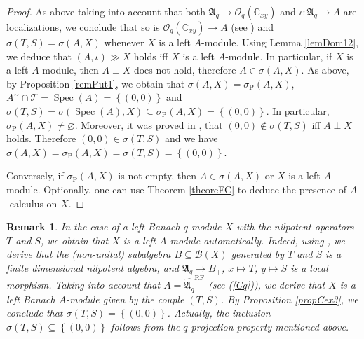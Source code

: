 \documentclass[12pt]{amsart}%
\theoremstyle{plain}
\newtheorem{remark}{Remark}
\numberwithin{equation}{section}
\numberwithin{equation}{section}
\numberwithin{theorem}{section}
\numberwithin{lemma}{section}
\numberwithin{remark}{section}
\numberwithin{example}{section}
\numberwithin{proposition}{section}
\numberwithin{definition}{section}
\numberwithin{corollary}{section}
\begin{document}
\begin{proof}
As above taking into account that both $\mathfrak{A}_{q}\rightarrow
\mathcal{O}_{q}\left(  \mathbb{C}_{xy}\right)  $ and $\iota:\mathfrak{A}%
_{q}\rightarrow A$ are localizations, we conclude that so is $\mathcal{O}%
_{q}\left(  \mathbb{C}_{xy}\right)  \rightarrow A$ (see \cite[Proposition
1.8]{Tay2}) and $\sigma\left(  T,S\right)  =\sigma\left(  A,X\right)  $
whenever $X$ is a left $A$-module. Using Lemma \ref{lemDom12}, we deduce that
$\left(  A,\iota\right)  \gg X$ holds iff $X$ is a left $A$-module. In
particular, if $X$ is a left $A$-module, then $A\perp X$ does not hold,
therefore $A\in\sigma\left(  A,X\right)  $. As above, by Proposition
\ref{remPut1}, we obtain that $\sigma\left(  A,X\right)  =\sigma
_{\operatorname{P}}\left(  A,X\right)  $, $A^{\sim}\cap\mathcal{T}%
=\operatorname{Spec}\left(  A\right)  =\left\{  \left(  0,0\right)  \right\}
$ and $\sigma\left(  T,S\right)  =\sigma\left(  \operatorname{Spec}\left(
A\right)  ,X\right)  \subseteq\sigma_{\operatorname{P}}\left(  A,X\right)
=\left\{  \left(  0,0\right)  \right\}  $. In particular, $\sigma
_{\operatorname{P}}\left(  A,X\right)  \neq\varnothing$. Moreover, it was
proved in \cite[Proposition 6.4]{Dosi25}, that $\left(  0,0\right)
\notin\sigma\left(  T,S\right)  $ iff $A\perp X$ holds. Therefore $\left(
0,0\right)  \in\sigma\left(  T,S\right)  $ and we have $\sigma\left(
A,X\right)  =\sigma_{\operatorname{P}}\left(  A,X\right)  =\sigma\left(
T,S\right)  =\left\{  \left(  0,0\right)  \right\}  $.

Conversely, if $\sigma_{\operatorname{P}}\left(  A,X\right)  $ is not empty,
then $A\in\sigma\left(  A,X\right)  $ or $X$ is a left $A$-module. Optionally,
one can use Theorem \ref{thcoreFC} to deduce the presence of $A$-calculus on
$X$.
\end{proof}

\begin{remark}
In the case of a left Banach $q$-module $X$ with the nilpotent operators $T$
and $S$, we obtain that $X$ is a left $A$-module automatically. Indeed, using
\cite[Lemma 3.1, 3.2]{Dosi24}, we derive that the (non-unital) subalgebra
$B\subseteq\mathcal{B}\left(  X\right)  $ generated by $T$ and $S$ is a finite
dimensional nilpotent algebra, and $\mathfrak{A}_{q}\rightarrow B_{+}$,
$x\mapsto T$, $y\mapsto S$ is a local morphism. Taking into account that
$A=\widehat{\mathfrak{A}_{q}}^{\text{RF}}$ (see (\ref{Cq})), we derive that
$X$ is a left Banach $A$-module given by the couple $\left(  T,S\right)  $. By
Proposition \ref{propCex3}, we conclude that $\sigma\left(  T,S\right)
=\left\{  \left(  0,0\right)  \right\}  $. Actually, the inclusion
$\sigma\left(  T,S\right)  \subseteq\left\{  \left(  0,0\right)  \right\}  $
follows from the $q$-projection property mentioned above.
\end{remark}
\end{document}
